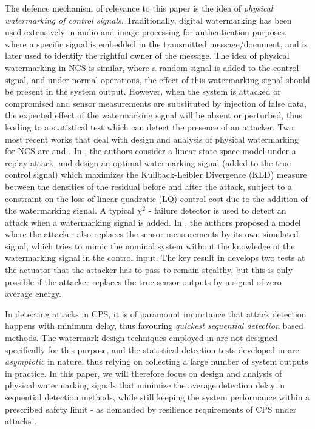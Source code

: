\documentclass[journal,10pt]{IEEEtran}
\begin{document}
The defence mechanism of relevance to this paper is the idea of {\em physical watermarking of control signals}. Traditionally, digital watermarking has been used extensively in audio and image processing for authentication purposes, where a specific signal is embedded in the transmitted message/document, and is later used to identify the rightful owner of the message. The idea of  physical watermarking in NCS is similar, where a random signal is added to the control signal, and under normal operations, the effect of this watermarking signal should be present in the system output. However, when the system is attacked or compromised and sensor measurements are substituted by injection of false data, the expected effect of the watermarking signal will be absent or perturbed, thus leading to  a statistical test which can detect the presence of an attacker. Two most recent works that deal with design and analysis of physical watermarking for NCS are \cite{mo_sinopoli_15} and \cite{kumar}. In \cite{mo_sinopoli_15}, the authors consider a linear state space model under a replay attack, and design an optimal watermarking signal (added to the true control signal) which maximizes the Kullback-Leibler Divergence (KLD) measure between the densities of the residual before and after the attack, subject to a constraint on the loss of linear quadratic (LQ) control cost due to the addition of the watermarking signal. A typical 
$\chi^2$ - failure detector is used to detect an attack when a watermarking signal is added. In \cite{kumar}, 
the authors proposed a model where the attacker also replaces the sensor measurements by its own simulated signal, which tries to mimic the nominal system  without the knowledge of the watermarking signal in the control input. The key result in \cite{kumar} develops two tests at the actuator that the attacker has to pass to remain stealthy, but this is only possible if the attacker replaces the true sensor outputs by a signal of zero average energy. 

In detecting attacks in CPS, it is of paramount importance that attack detection happens with minimum delay, thus favouring {\em quickest sequential detection} based methods. The watermark design techniques employed in 
\cite{mo_sinopoli_15, kumar} are not designed specifically for this purpose, and the statistical detection tests developed in \cite{kumar} are {\em asymptotic} in nature, thus relying on collecting a large number of system outputs in practice. In this paper, we will therefore focus on design and analysis of physical watermarking signals that minimize the average detection delay in sequential detection methods, while still keeping the system performance within a prescribed safety limit - as demanded by resilience requirements of CPS under attacks
\cite{cardenas_sastry_08}. 
\end{document}
